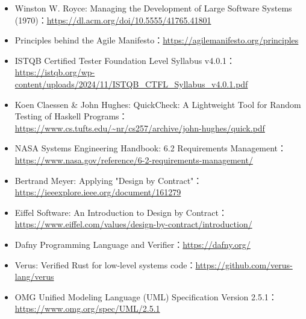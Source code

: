 \documentclass[UTF8,a4paper,11pt,fontset=fandol]{ctexart}
\begin{document}
\begin{itemize}
\item Winston W. Royce: Managing the Development of Large Software Systems (1970)：\url{https://dl.acm.org/doi/10.5555/41765.41801}

\item Principles behind the Agile Manifesto：\url{https://agilemanifesto.org/principles}

\item ISTQB Certified Tester Foundation Level Syllabus v4.0.1：\url{https://istqb.org/wp-content/uploads/2024/11/ISTQB_CTFL_Syllabus_v4.0.1.pdf}

\item Koen Claessen \& John Hughes: QuickCheck: A Lightweight Tool for Random Testing of Haskell Programs：\url{https://www.cs.tufts.edu/~nr/cs257/archive/john-hughes/quick.pdf}

\item NASA Systems Engineering Handbook: 6.2 Requirements Management：\url{https://www.nasa.gov/reference/6-2-requirements-management/}

\item Bertrand Meyer: Applying "Design by Contract"：\url{https://ieeexplore.ieee.org/document/161279}

\item Eiffel Software: An Introduction to Design by Contract：\url{https://www.eiffel.com/values/design-by-contract/introduction/}

\item Dafny Programming Language and Verifier：\url{https://dafny.org/}

\item Verus: Verified Rust for low-level systems code：\url{https://github.com/verus-lang/verus}

\item OMG Unified Modeling Language (UML) Specification Version 2.5.1：\url{https://www.omg.org/spec/UML/2.5.1}

\end{itemize}
\end{document}
